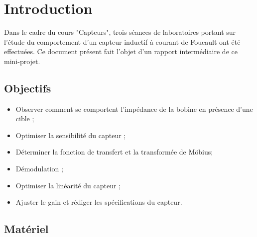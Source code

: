 

\section{Introduction}

Dans le cadre du cours "Capteurs", trois séances de laboratoires portant
sur l'étude du comportement d'un capteur inductif à courant de Foucault ont été effectuées. 
Ce document présent fait l'objet d'un rapport intermédiaire de ce mini-projet.

\subsection{Objectifs}

\begin{itemize}

    \item Observer comment se comportent l'impédance de la bobine en présence d'une cible ;
    \item Optimiser la sensibilité du capteur ;
    \item Déterminer la fonction de transfert et la transformée de Möbius;
    \item Démodulation ;
    \item Optimiser la linéarité du capteur ;
    \item Ajuster le gain et rédiger les spécifications du capteur.
\end{itemize}

\subsection{Matériel}

